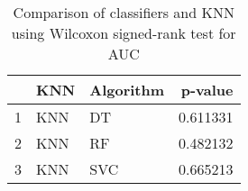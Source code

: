 \begin{table}
\footnotesize
\caption{Comparison of classifiers and KNN using Wilcoxon signed-rank test for AUC}
\label{tab:KNN wilcoxon AUC comparison}
\begin{tabular}{lllr}
\hline
 & KNN & Algorithm & p-value \\
\hline
1 & KNN & DT & 0.611331 \\
2 & KNN & RF & 0.482132 \\
3 & KNN & SVC & 0.665213 \\
\hline
\end{tabular}
\end{table}
